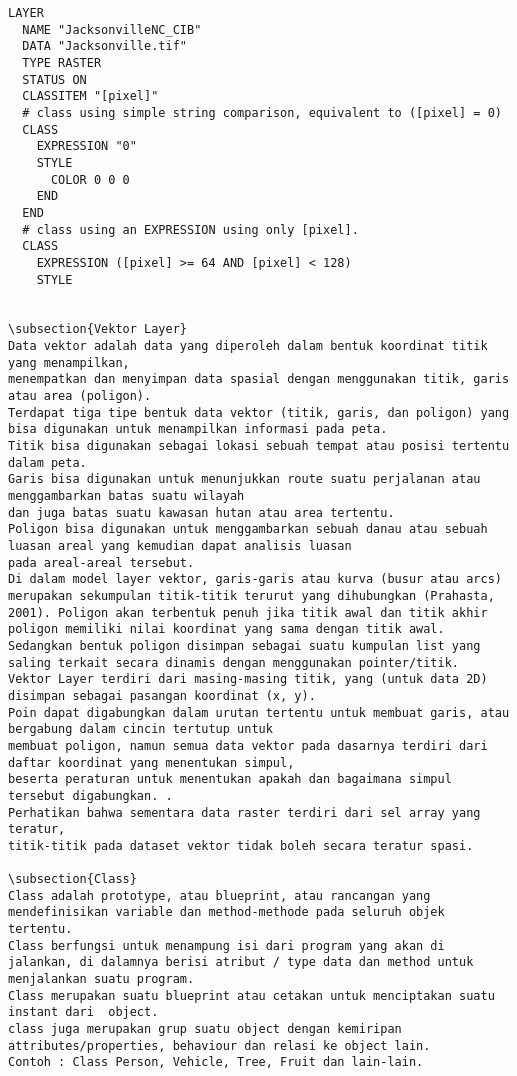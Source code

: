 \begin{verbatim}
LAYER
  NAME "JacksonvilleNC_CIB"
  DATA "Jacksonville.tif"
  TYPE RASTER
  STATUS ON
  CLASSITEM "[pixel]"
  # class using simple string comparison, equivalent to ([pixel] = 0)
  CLASS
    EXPRESSION "0"
    STYLE
      COLOR 0 0 0
    END
  END
  # class using an EXPRESSION using only [pixel].
  CLASS
    EXPRESSION ([pixel] >= 64 AND [pixel] < 128)
    STYLE


\subsection{Vektor Layer}
Data vektor adalah data yang diperoleh dalam bentuk koordinat titik yang menampilkan, 
menempatkan dan menyimpan data spasial dengan menggunakan titik, garis atau area (poligon). 
Terdapat tiga tipe bentuk data vektor (titik, garis, dan poligon) yang bisa digunakan untuk menampilkan informasi pada peta. 
Titik bisa digunakan sebagai lokasi sebuah tempat atau posisi tertentu dalam peta. 
Garis bisa digunakan untuk menunjukkan route suatu perjalanan atau menggambarkan batas suatu wilayah 
dan juga batas suatu kawasan hutan atau area tertentu. 
Poligon bisa digunakan untuk menggambarkan sebuah danau atau sebuah luasan areal yang kemudian dapat analisis luasan 
pada areal-areal tersebut.
Di dalam model layer vektor, garis-garis atau kurva (busur atau arcs) merupakan sekumpulan titik-titik terurut yang dihubungkan (Prahasta, 2001). Poligon akan terbentuk penuh jika titik awal dan titik akhir poligon memiliki nilai koordinat yang sama dengan titik awal. Sedangkan bentuk poligon disimpan sebagai suatu kumpulan list yang saling terkait secara dinamis dengan menggunakan pointer/titik.
Vektor Layer terdiri dari masing-masing titik, yang (untuk data 2D) disimpan sebagai pasangan koordinat (x, y). 
Poin dapat digabungkan dalam urutan tertentu untuk membuat garis, atau bergabung dalam cincin tertutup untuk 
membuat poligon, namun semua data vektor pada dasarnya terdiri dari daftar koordinat yang menentukan simpul, 
beserta peraturan untuk menentukan apakah dan bagaimana simpul tersebut digabungkan. .
Perhatikan bahwa sementara data raster terdiri dari sel array yang teratur, 
titik-titik pada dataset vektor tidak boleh secara teratur spasi.

\subsection{Class}
Class adalah prototype, atau blueprint, atau rancangan yang mendefinisikan variable dan method-methode pada seluruh objek tertentu. 
Class berfungsi untuk menampung isi dari program yang akan di jalankan, di dalamnya berisi atribut / type data dan method untuk menjalankan suatu program.
Class merupakan suatu blueprint atau cetakan untuk menciptakan suatu instant dari  object. 
class juga merupakan grup suatu object dengan kemiripan attributes/properties, behaviour dan relasi ke object lain. 
Contoh : Class Person, Vehicle, Tree, Fruit dan lain-lain.


\end{verbatim}
